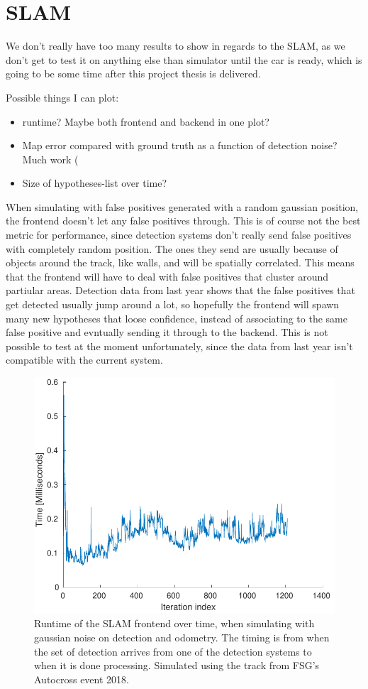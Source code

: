 \section{SLAM}

We don't really have too many results to show in regards to the SLAM, as we don't get to test it on anything else than simulator until the car is ready, which is going to be some time after this project thesis is delivered. 

Possible things I can plot:
\begin{itemize}
    \item runtime? Maybe both frontend and backend in one plot?
    \item Map error compared with ground truth as a function of detection noise? Much work \:(
    \item Size of hypotheses-list over time?
\end{itemize}

When simulating with false positives generated with a random gaussian position, the frontend doesn't let any false positives through. This is of course not the best metric for performance, since detection systems don't really send false positives with completely random position. The ones they send are usually because of objects around the track, like walls, and will be spatially correlated. This means that the frontend will have to deal with false positives that cluster around partiular areas. Detection data from last year shows that the false positives that get detected usually jump around a lot, so hopefully the frontend will spawn many new hypotheses that loose confidence, instead of associating to the same false positive and evntually sending it through to the backend. This is not possible to test at the moment unfortunately, since the data from last year isn't compatible with the current system. 

\begin{figure}
    \centering
    \includegraphics[width=0.8\linewidth]{0_Images/6_Results/FrontendTiming.pdf}
    \caption[Runtime of the SLAM frontend.]
    {Runtime of the SLAM frontend over time, when simulating with gaussian noise on detection and odometry. The timing is from when the set of detection arrives from one of the detection systems to when it is done processing. Simulated using the track from FSG's Autocross event 2018.}
    \label{Fig:FrontendTiming}
\end{figure}

